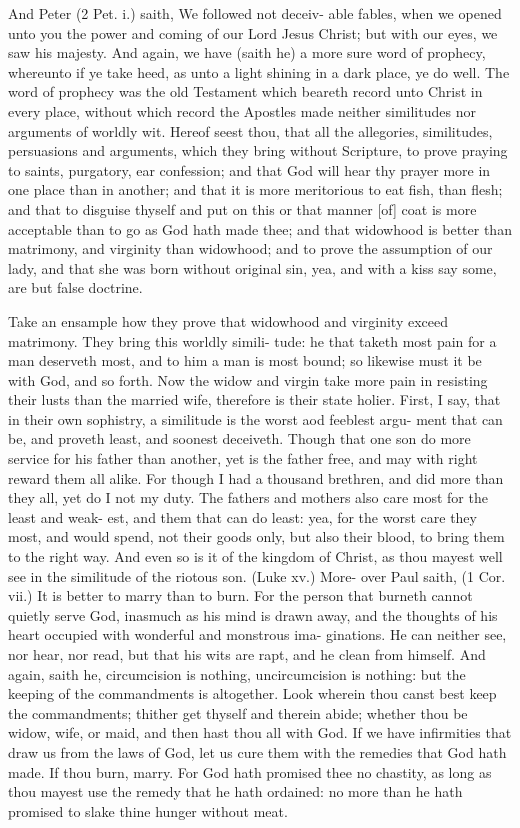 \documentclass{custom}
\begin{document}
And Peter (2 Pet. i.) saith, We followed not deceiv-
able fables, when we opened unto you the power and
coming of our Lord Jesus Christ; but with our eyes, we
saw his majesty. And again, we have (saith he) a more 
sure word of prophecy, whereunto if ye take heed, as 
unto a light shining in a dark place, ye do well. The 
word of prophecy was the old Testament which beareth 
record unto Christ in every place, without which record 
the Apostles made neither similitudes nor arguments of 
worldly wit. Hereof seest thou, that all the allegories, 
similitudes, persuasions and arguments, which they bring 
without Scripture, to prove praying to saints, purgatory, 
ear confession; and that God will hear thy prayer more 
in one place than in another; and that it is more meritorious 
to eat fish, than flesh; and that to disguise thyself and put 
on this or that manner [of] coat is more acceptable than to go 
as God hath made thee; and that widowhood is better than 
matrimony, and virginity than widowhood; and to prove 
the assumption of our lady, and that she was born without 
original sin, yea, and with a kiss say some, are but false 
doctrine. 

Take an ensample how they prove that widowhood and 
virginity exceed matrimony. They bring this worldly simili- 
tude: he that taketh most pain for a man deserveth 
most, and to him a man is most bound; so likewise must 
it be with God, and so forth. Now the widow and virgin 
take more pain in resisting their lusts than the married wife, 
therefore is their state holier. First, I say, that in their 
own sophistry, a similitude is the worst aod feeblest argu- 
ment that can be, and proveth least, and soonest deceiveth. 
Though that one son do more service for his father than 
another, yet is the father free, and may with right reward 
them all alike. For though I had a thousand brethren, 
and did more than they all, yet do I not my duty. The 
fathers and mothers also care most for the least and weak- 
est, and them that can do least: yea, for the worst care 
they most, and would spend, not their goods only, but also 
their blood, to bring them to the right way. And even so 
is it of the kingdom of Christ, as thou mayest well see in 
the similitude of the riotous son. (Luke xv.) More- 
over Paul saith, (1 Cor. vii.) It is better to marry than 
to burn. For the person that burneth cannot quietly serve 
God, inasmuch as his mind is drawn away, and the thoughts 
of his heart occupied with wonderful and monstrous ima- 
ginations. He can neither see, nor hear, nor read, but 
that his wits are rapt, and he clean from himself. And 
again, saith he, circumcision is nothing, uncircumcision is 
nothing: but the keeping of the commandments is altogether. 
Look wherein thou canst best keep the commandments; 
thither get thyself and therein abide; whether thou be 
widow, wife, or maid, and then hast thou all with God.
If we have infirmities that draw us from the laws of God,
let us cure them with the remedies that God hath made.
If thou burn, marry. For God hath promised thee no
chastity, as long as thou mayest use the remedy that he
hath ordained: no more than he hath promised to slake
thine hunger without meat.
\end{document}
